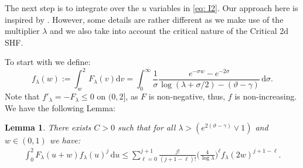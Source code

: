 \documentclass[a4paper,reqno,11pt]{amsart}
\numberwithin{equation}{section}
\theoremstyle{mytheorem}
\newtheorem{lemma}[theorem]{Lemma}
\newcommand{\gl}{\lambda}
\newcommand{\gs}{\sigma}
\renewcommand{\theta}{\vartheta}
\newcommand\ra{\left(}
\newcommand\rb{\right)}
\newcommand\dd{\mathrm{d}}
\begin{document}
{The next step is to integrate over the $u$ variables in \eqref{eq: I2}. Our approach here is
inspired by  \cite{CZ23}. 
However, some details are rather different as we make use of the multiplier $\lambda$ and
we also take into account the critical nature of the Critical 2d SHF. 

To start with we define:
\begin{equation}\label{eq: def of f}
    f_\gl(w):= \int^{2}_w F_\gl(v) \dd v = \int^\infty_0 
     \frac{1}{\gs} \frac{e^{-\gs w}-e^{-2\gs}}{\log(\gl+\gs/2)-(\theta-\gamma)}  \, \dd\gs .
    \end{equation}
Note that $f'_\lambda=-F_\lambda\leq 0$ on $(0,2]$, as $F$ is non-negative, thus, $f$ is non-increasing.
We have the following Lemma:
\begin{lemma}\label{lemma:fF}
    There exists $C>0$ such that for all $\lambda> \ra e^{2(\theta-\gamma)} \vee 1 \rb$
    and $w\in (0,1)$ we have:
    \begin{align}\label{fF:eq1}
        \int_0^{2}  F_\gl(u+w)  f_\gl(u)^j \,\dd u
     \le \sum^{j+1}_{\ell=0}
       \frac{j!}{(j+1-\ell)!} \Big(\frac{4}{\log\lambda} \Big)^\ell
        f_\gl( 2 w)^{j+1-\ell}.
    \end{align}
\end{lemma}

}
\end{document}
